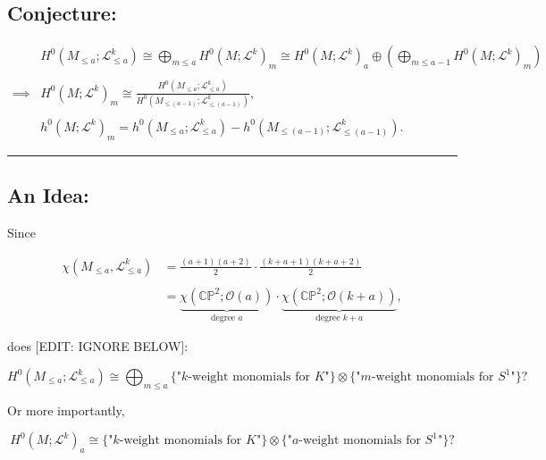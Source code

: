\documentclass[11pt]{article}
\begin{document}
\hypertarget{conjecture}{%
\subsection{Conjecture:}\label{conjecture}}

\[ \begin{split} &H^{0}(M_{\leq a}; \mathcal{L}_{\leq a}^{k}) \cong \bigoplus_{m \leq a} H^{0}(M ; \mathcal{L}^{k})_{m} \cong H^{0}(M; \mathcal{L}^{k})_{a} \oplus \left( \bigoplus_{m \leq a -1} H^{0}(M ; \mathcal{L}^{k})_{m} \right)   \\ & \\ \implies &H^{0}(M; \mathcal{L}^{k})_{m} \cong \frac{H^{0}(M_{\leq a}; \mathcal{L}_{\leq a}^{k})}{H^{0}(M_{\leq (a-1)}; \mathcal{L}_{\leq (a-1)}^{k})}, \\ & \\ &h^{0}(M; \mathcal{L}^{k})_{m} = h^{0}(M_{\leq a}; \mathcal{L}_{\leq a}^{k}) - h^{0}(M_{\leq (a-1)}; \mathcal{L}_{\leq (a-1)}^{k}). \end{split} \]

\begin{center}\rule{0.5\linewidth}{0.5pt}\end{center}

\hypertarget{an-idea}{%
\subsection{An Idea:}\label{an-idea}}

Since

\[ \begin{split} \chi\left(M_{\leq a}, \mathcal{L}_{\leq a}^{k}\right) &= \frac{(a+1)(a+2)}{2} \cdot \frac{(k+a+1)(k+a+2)}{2} \\ & \\ &= \underbrace{\chi\left(\mathbb{CP}^{2}; \mathcal{O}(a)\right)}_{\text{degree $a$}} \cdot \underbrace{\chi\left(\mathbb{CP}^{2}; \mathcal{O}(k + a)\right)}_{\text{degree } k+a}, \end{split} \]

does [EDIT: IGNORE BELOW]:

\[ H^{0}(M_{\leq a}; \mathcal{L}_{\leq a}^{k}) \cong \bigoplus_{m \leq a} \{ \text{"$k$-weight monomials for $K$"} \} \otimes \{ \text{"$m$-weight monomials for $S^{1}$"} \}? \]

Or more importantly,

\[ H^{0}(M; \mathcal{L}^{k})_{a} \cong \{ \text{"$k$-weight monomials for $K$"} \} \otimes \{ \text{"$a$-weight monomials for $S^{1}$"} \}? \]
\end{document}
